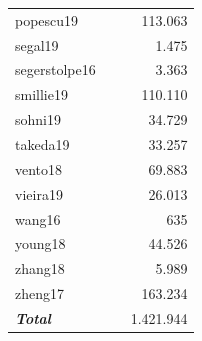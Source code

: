 \begin{table}[ht!]
\begin{tabular}{l|c|r}
popescu19 & ~\citep{popescu_decoding_2019} & 113.063  \\

segal19 & ~\citep{segal_single_2019} & 1.475  \\

segerstolpe16 & ~\citep{segerstolpe_single-cell_2016} & 3.363  \\

smillie19 & ~\citep{smillie_intra-_2019} & 110.110  \\

sohni19 & ~\citep{sohni_neonatal_2019} & 34.729  \\

takeda19 & ~\citep{takeda_single-cell_2019} & 33.257  \\

vento18 & ~\citep{vento-tormo_single-cell_2018} & 69.883  \\

vieira19 & ~\citep{braga_cellular_2019} & 26.013  \\

wang16 & ~\citep{wang_single-cell_2016} & 635  \\

young18 & ~\citep{young_single-cell_2018} & 44.526  \\

zhang18 & ~\citep{zhang_lineage_2018} & 5.989  \\

zheng17 & ~\citep{zheng_massively_2017} & 163.234  \\
\midrule
\textbf{\textit{Total}} &  & 1.421.944  \\

\bottomrule
\end{tabular}
\end{table}

